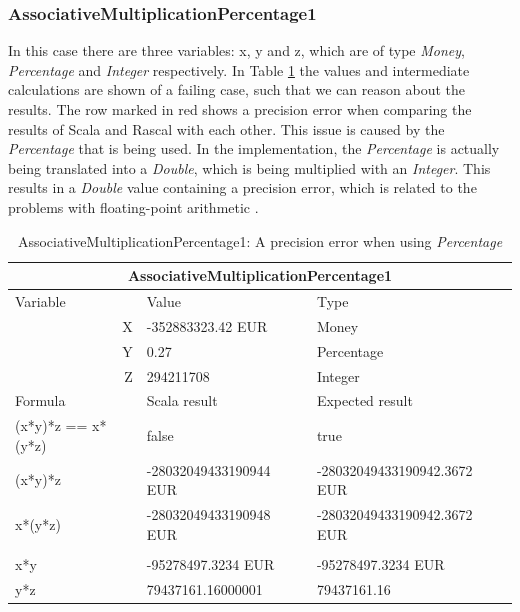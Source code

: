 \subsubsection{AssociativeMultiplicationPercentage1}
In this case there are three variables: x, y and z, which are of type
\textit{Money}, \textit{Percentage} and \textit{Integer} respectively. In Table
\ref{ch4_init_check_AssociativeMultiplicationPercentage1} the values and
intermediate calculations are shown of a failing case, such that we can reason
about the results. The row marked in red shows a precision error when comparing
the results of Scala and Rascal with each other. This issue is caused by the
\textit{Percentage} that is being used. In the implementation, the
\textit{Percentage} is actually being translated into a \textit{Double}, which
is being multiplied with an \textit{Integer}. This results in a \textit{Double}
value containing a precision error, which is related to the problems with
floating-point arithmetic \cite{goldberg1991every}.
\\
\begin{table}[h!]
\centering
\begin{tabular}{|lll|}
\hline
\multicolumn{3}{|c|}{AssociativeMultiplicationPercentage1}                    \\ \hline
Variable               & Value                  & Type                        \\
\multicolumn{1}{|r}{X} & -352883323.42 EUR      & Money                       \\
\multicolumn{1}{|r}{Y} & 0.27                   & Percentage                  \\
\multicolumn{1}{|r}{Z} & 294211708              & Integer                     \\ \hline
Formula                & Scala result           & Expected result             \\
(x*y)*z == x*(y*z)     & false                  & true                        \\
(x*y)*z                & -28032049433190944 EUR & -28032049433190942.3672 EUR \\
x*(y*z)                & -28032049433190948 EUR & -28032049433190942.3672 EUR \\
                       &                        &                             \\
x*y                    & -95278497.3234 EUR     & -95278497.3234 EUR          \\
y*z                    & 79437161.16000001      & 79437161.16                 \\ \hline
\end{tabular}
\caption{AssociativeMultiplicationPercentage1: A precision error when using \textit{Percentage}}
\label{ch4_init_check_AssociativeMultiplicationPercentage1}
\end{table}
